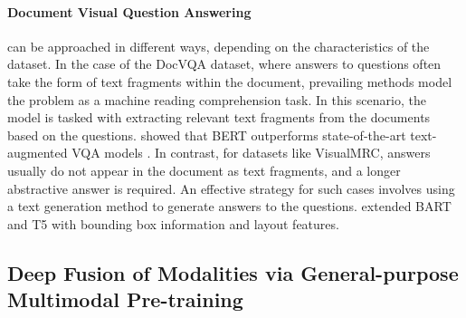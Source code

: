 \paragraph{Document Visual Question Answering} can be approached in different ways, depending on the characteristics of the dataset. In the case of the DocVQA dataset, where answers to questions often take the form of text fragments within the document, prevailing methods model the problem as a machine reading comprehension task. In this scenario, the model is tasked with extracting relevant text fragments from the documents based on the questions. \citet{mathew2021docvqa} showed that BERT outperforms state-of-the-art text-augmented \ac{VQA} models \citep{singh2019towards, hu2020iterative}. In contrast, for datasets like VisualMRC, answers usually do not appear in the document as text fragments, and a longer abstractive answer is required. An effective strategy for such cases involves using a text generation method to generate answers to the questions. \citet{tanaka2021visualmrc} extended BART and T5 with bounding box information and layout features.



\subsection{Deep Fusion of Modalities via General-purpose Multimodal Pre-training}
\label{subsection:chapter2-deep-fusion}

